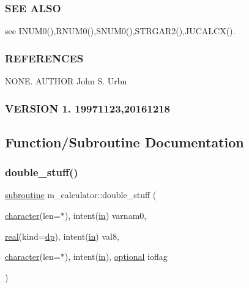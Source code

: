 \subsubsection*{S\+EE A\+L\+SO}

see I\+N\+U\+M0(),R\+N\+U\+M0(),S\+N\+U\+M0(),S\+T\+R\+G\+A\+R2(),J\+U\+C\+A\+L\+C\+X(). \subsubsection*{R\+E\+F\+E\+R\+E\+N\+C\+ES}

N\+O\+NE. A\+U\+T\+H\+OR John S. Urbn \subsubsection*{V\+E\+R\+S\+I\+ON 1. 19971123,20161218}

\subsection{Function/\+Subroutine Documentation}
\mbox{\label{namespacem__calculator_ab70b7eb8f684537155298c061b54c356}} 
\subsubsection{\texorpdfstring{double\+\_\+stuff()}{double\_stuff()}}
{\footnotesize\ttfamily \hyperlink{M__stopwatch_83_8txt_acfbcff50169d691ff02d4a123ed70482}{subroutine} m\+\_\+calculator\+::double\+\_\+stuff (\begin{DoxyParamCaption}\item[{\hyperlink{option__stopwatch_83_8txt_abd4b21fbbd175834027b5224bfe97e66}{character}(len=$\ast$), intent(\hyperlink{M__journal_83_8txt_afce72651d1eed785a2132bee863b2f38}{in})}]{varnam0,  }\item[{\hyperlink{read__watch_83_8txt_abdb62bde002f38ef75f810d3a905a823}{real}(kind=\hyperlink{namespacem__calculator_aefb5a6c3001bb0f09ed82decb6def950}{dp}), intent(\hyperlink{M__journal_83_8txt_afce72651d1eed785a2132bee863b2f38}{in})}]{val8,  }\item[{\hyperlink{option__stopwatch_83_8txt_abd4b21fbbd175834027b5224bfe97e66}{character}(len=$\ast$), intent(\hyperlink{M__journal_83_8txt_afce72651d1eed785a2132bee863b2f38}{in}), \hyperlink{option__stopwatch_83_8txt_aa4ece75e7acf58a4843f70fe18c3ade5}{optional}}]{ioflag }\end{DoxyParamCaption})\hspace{0.3cm}{\ttfamily [private]}}



